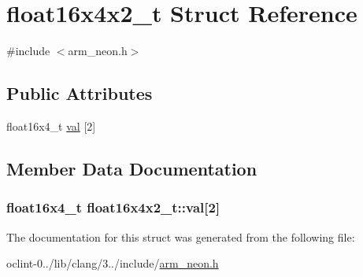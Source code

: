 \hypertarget{structfloat16x4x2__t}{\section{float16x4x2\-\_\-t Struct Reference}
\label{structfloat16x4x2__t}
}


{\ttfamily \#include $<$arm\-\_\-neon.\-h$>$}

\subsection*{Public Attributes}
\begin{DoxyCompactItemize}
\item 
float16x4\-\_\-t \hyperlink{structfloat16x4x2__t_aed05f60c7b620afd2834ecde893cf1ec}{val} \mbox{[}2\mbox{]}
\end{DoxyCompactItemize}


\subsection{Member Data Documentation}
\hypertarget{structfloat16x4x2__t_aed05f60c7b620afd2834ecde893cf1ec}{
\subsubsection[{val}]{\setlength{\rightskip}{0pt plus 5cm}float16x4\-\_\-t float16x4x2\-\_\-t\-::val\mbox{[}2\mbox{]}}}\label{structfloat16x4x2__t_aed05f60c7b620afd2834ecde893cf1ec}


The documentation for this struct was generated from the following file\-:\begin{DoxyCompactItemize}
\item 
oclint-\/0../lib/clang/3../include/\hyperlink{arm__neon_8h}{arm\-\_\-neon.\-h}\end{DoxyCompactItemize}
